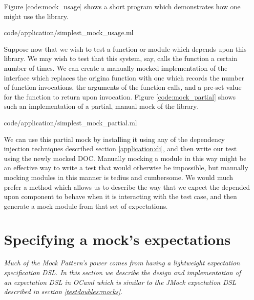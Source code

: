 Figure \ref{code:mock_usage} shows a short program which demonstrates
how one might use the  library.

 {code/application/simplest_mock_usage.ml}

Suppose now that we wish to test a function or module which depends
upon this  library. We may wish to test that this system,
say, calls the  function a certain number of times. We can
create a manually mocked implementation of the  interface
which replaces the origina  function with one which records
the number of function invocations, the arguments of the function
calls, and a pre-set value for the function to return upon
invocation. Figure \ref{code:mock_partial} shows such an
implementation of a partial, manual mock of the  library.


 {code/application/simplest_mock_partial.ml}

We can use this partial mock by installing it using any of the
dependency injection techniques described section
\ref{application:di}, and then write our test using the newly mocked
DOC. Manually mocking a module in this way might be an effective way
to write a test that would otherwise be impossible, but manually
mocking modules in this manner is tedius and cumbersome. We would much
prefer a method which allows us to describe the way that we expect the
depended upon component to behave when it is interacting with the test
case, and then generate a mock module from that set of expectations.

\section{Specifying a mock's expectations}
\label{application:expectations}

\textit{Much of the Mock Pattern's power comes from having a
  lightweight expectation specification DSL. In this section we
  describe the design and implementation of an expectation DSL in
  OCaml which is similar to the JMock expectation DSL described in
  section \ref{testdoubles:mocks}.}

